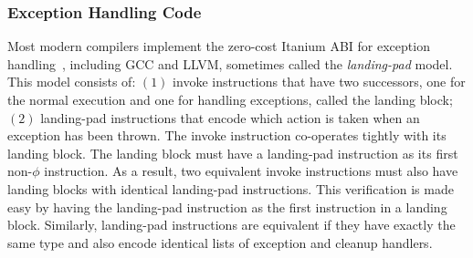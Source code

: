 \subsubsection{Exception Handling Code}


Most modern compilers implement the zero-cost Itanium ABI for exception
handling~\cite{dinechin00}, including GCC and LLVM, sometimes called the
\textit{landing-pad} model.
This model consists of:
$(1)$ invoke instructions that have two successors, one for the normal execution and
one for handling exceptions, called the landing block;
$(2)$ landing-pad instructions that encode which action is taken when an exception has
been thrown.
The invoke instruction co-operates tightly with its landing block.
The landing block must have a landing-pad instruction as its first non-$\phi$
instruction.
As a result, two equivalent invoke instructions must also have landing blocks
with identical landing-pad instructions.
This verification is made easy by having the landing-pad instruction as the first
instruction in a landing block.
Similarly, landing-pad instructions are equivalent if they have exactly the same
type and also encode identical lists of exception and cleanup handlers.




